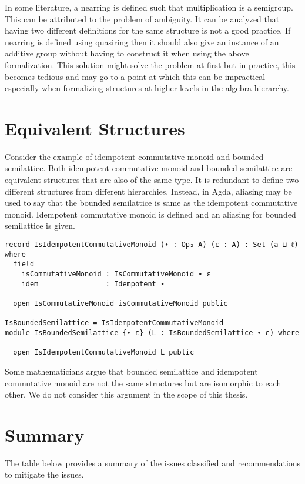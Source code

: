 In some literature, a nearring is defined such that multiplication is a
semigroup. This can be attributed to the problem of ambiguity. It can be
analyzed that having two different definitions for the same structure is not a
good practice. If nearring is defined using quasiring then it should also give
an instance of an additive group without having to construct it when using the
above formalization. This solution might solve the problem at first but in
practice, this becomes tedious and may go to a point at which this can be
impractical especially when formalizing structures at higher levels in the
algebra hierarchy.

\section{Equivalent Structures}
Consider the example of idempotent commutative monoid and bounded semilattice.
Both idempotent commutative monoid and bounded semilattice are equivalent
structures that are also of the same type. It is redundant to define two different
structures from different hierarchies. Instead, in Agda, aliasing may be used to
say that the bounded semilattice is same as the idempotent commutative monoid.
Idempotent commutative monoid is defined and an aliasing for bounded semilattice
is given.

\begin{verbatim}
record IsIdempotentCommutativeMonoid (∙ : Op₂ A) (ε : A) : Set (a ⊔ ℓ) where
  field
    isCommutativeMonoid : IsCommutativeMonoid ∙ ε
    idem                : Idempotent ∙

  open IsCommutativeMonoid isCommutativeMonoid public

IsBoundedSemilattice = IsIdempotentCommutativeMonoid
module IsBoundedSemilattice {∙ ε} (L : IsBoundedSemilattice ∙ ε) where

  open IsIdempotentCommutativeMonoid L public
\end{verbatim}

Some mathematicians argue that bounded semilattice and idempotent
commutative monoid are not the same structures but are isomorphic to each other.
We do not consider this argument in the scope of this thesis.

\section{Summary}
The table below provides a summary of the issues classified and recommendations
to mitigate the issues.

